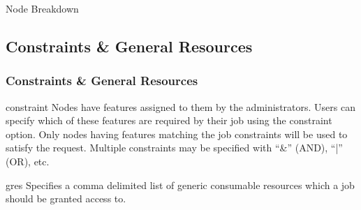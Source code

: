 \begin{frame}
\begin{block}{\small Node Breakdown}
\centering

\end{block}
\end{frame}

\subsection{Constraints \& General Resources}

\begin{frame}
\frametitle{Constraints \&  General Resources}
\begin{block}{{\ddash}constraint} Nodes have features assigned to them by the administrators. Users can specify which of these features are required by their job using the constraint option. Only nodes having features matching the job constraints will be used to satisfy the request.  Multiple constraints may be specified with ``\&'' (AND), ``|'' (OR), etc.
\end{block}
\begin{block}{{\ddash}gres} Specifies a comma delimited list of generic consumable resources which a job should be granted access to. 
\end{block}
\end{frame}

